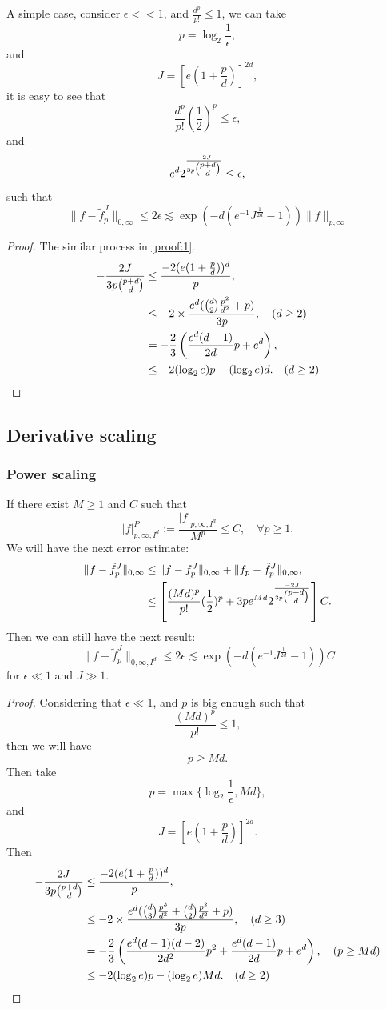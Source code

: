 A simple case, consider $\epsilon << 1$, and $\frac{d^p}{p!} \le 1$, we can take
$$
p = \log_2 \frac{1}{\epsilon},
$$
and 
$$
J = [e(1 + \frac{p}{d})]^{2d},
$$
it is easy to see that
$$
\frac{d^p}{p!} (\frac{1}{2})^p \le \epsilon,
$$
and 
$$
e^d  2^{\frac{-2J}{3p\tbinom{p+d}{d}}} \le \epsilon,
$$
such that
$$
\|f- \tilde f^J_p\|_{0,\infty}  \le 2\epsilon \lesssim \exp(-d(e^{-1}J^{\frac{1}{2d}} - 1))\|f\|_{p, \infty}
$$
\begin{proof}\label{proof:2}
The similar process in \ref{proof:1}.
\begin{align}
-\frac{2J}{3p\tbinom{p+d}{d}} &\le \frac{-2(e(1+\frac{p}{d}))^d}{p}, \\
&\le -2 \times \frac{ e^{d}(\tbinom{d}{2}\frac{p^2}{d^2} + p)}{3p}, \quad (d \ge 2) \\
&= -\frac{2}{3}\left( \frac{e^{d}(d-1)}{2d}p + e^d \right), \\
&\le - 2(\log_2{e}) p - (\log_2e)d. \quad (d \ge 2)
\end{align}
\end{proof}


\subsection{Derivative scaling}
\subsubsection{Power scaling}
If there exist $M \ge 1$ and $C$ such that
$$
|f|^P_{p,\infty,I^d} := \frac{|f|_{p,\infty,I^d}}{M^p} \le C, \quad \forall p \ge 1.
$$
We will have the next error estimate:
	\begin{align}
\|f- \tilde f^J_p\|_{0,\infty} &\le \|f - f^J_p\|_{0,\infty} + \|f_p - \tilde f^J_p\|_{0,\infty}, \\
&\le \left[  \frac{(Md)^p}{p!} (\frac{1}{2})^p +3pe^{Md}  2^{\frac{-2J}{3p\tbinom{p+d}{d}}}\right] C.
\end{align}
Then we can still have the next result:
\begin{equation}
\|f- \tilde f^J_p\|_{0,\infty, I^d}  \le 2\epsilon \lesssim \exp(-d(e^{-1}J^{\frac{1}{2d}} - 1))C
\end{equation}
for $\epsilon \ll 1$ and $J \gg1$.
\begin{proof}
Considering that $\epsilon \ll 1$, and $p$ is big enough such that 
$$
 \frac{(Md)^p}{p!} \le 1,
$$
then we will have
$$
p \ge Md.
$$
Then take 
$$
p = \max\{\log_2\frac{1}{\epsilon}, Md\},
$$
and
$$
J = [e(1 + \frac{p}{d})]^{2d}.
$$
Then
\begin{align}
-\frac{2J}{3p\tbinom{p+d}{d}} &\le \frac{-2(e(1+\frac{p}{d}))^d}{p}, \\
&\le -2 \times \frac{ e^{d}(\tbinom{d}{3}\frac{p^3}{d^3}  + \tbinom{d}{2}\frac{p^2}{d^2} + p)}{3p}, \quad (d \ge 3) \\
&= -\frac{2}{3}\left(  \frac{e^{d}(d-1)(d-2)}{2d^2}p^2 + \frac{e^{d}(d-1)}{2d}p + e^d \right), \quad (p \ge Md)\\
&\le - 2(\log_2{e}) p - (\log_2e)Md. \quad (d \ge 2)
\end{align}
\end{proof}
